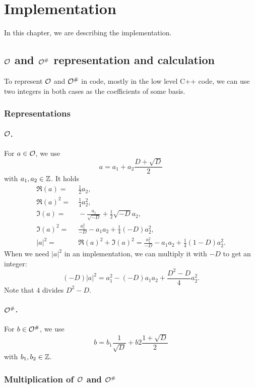 
\section{Implementation}

In this chapter, we are describing the implementation.

\subsection{$\mathcal{O}$ and $\mathcal{O}^\#$ representation and calculation}

To represent $\mathcal{O}$ and $\mathcal{O}^\#$ in code, mostly in the low level C++ code, we can use two integers in both cases as the coefficients of some basis.

\subsubsection{Representations}

\paragraph{$\mathcal{O}$.}

For $a \in \mathcal{O}$, we use
\[ a = a_1 + a_2 \frac{D + \sqrt{D}} {2} \]
with $a_1,a_2 \in \mathbb{Z}$. It holds
\begin{align*}
\Re(a) = &\; \frac{1}{2} a_2, \\
\Re(a)^2 = &\; \frac{1}{4} a_2^2, \\
\Im(a) = &\; -\frac{a_1}{\sqrt{-D}} + \frac{1}{2} \sqrt{-D} a_2, \\
\Im(a)^2 = &\; \frac{a_1^2}{-D} - a_1 a_2 + \frac{1}{4} (-D) a_2^2, \\
|a|^2 = &\; \Re(a)^2 + \Im(a)^2 = \frac{a_1^2}{-D} - a_1 a_2 + \frac{1}{4} (1-D) a_2^2 .
\end{align*}
When we need $|a|^2$ in an implementation, we can multiply it with $-D$ to get an integer:
\[ (-D) |a|^2 = a_1^2 - (-D) a_1 a_2 + \frac{D^2-D}{4} a_2^2 . \]
Note that $4$ divides $D^2 - D$.

\paragraph{$\mathcal{O}^\#$.}

For $b \in \mathcal{O}^\#$, we use
\[ b = b_1 \frac{1}{\sqrt{D}} + b2 \frac{1 + \sqrt{D}} {2} \]
with $b_1,b_2 \in \mathbb{Z}$.

\subsubsection{Multiplication of $\mathcal{O}$ and $\mathcal{O}^\#$}

